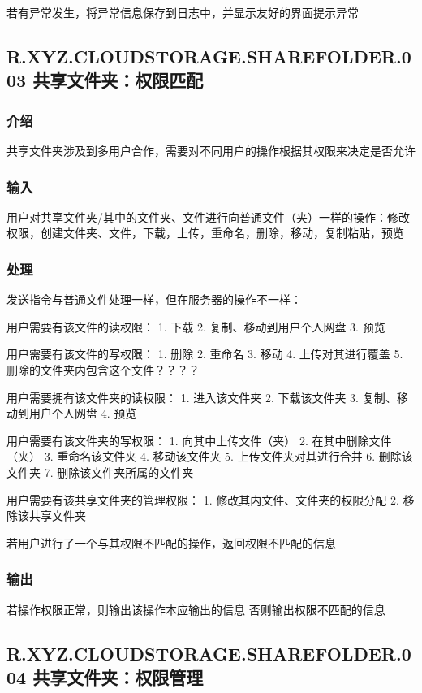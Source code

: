 若有异常发生，将异常信息保存到日志中，并显示友好的界面提示异常


\subsection{R.XYZ.CLOUDSTORAGE.SHAREFOLDER.003 共享文件夹：权限匹配}

\subsubsection{介绍}
共享文件夹涉及到多用户合作，需要对不同用户的操作根据其权限来决定是否允许

\subsubsection{输入} 
用户对共享文件夹/其中的文件夹、文件进行向普通文件（夹）一样的操作：修改权限，创建文件夹、文件，下载，上传，重命名，删除，移动，复制粘贴，预览

\subsubsection{处理} 
发送指令与普通文件处理一样，但在服务器的操作不一样：

用户需要有该文件的读权限：
1. 下载
2. 复制、移动到用户个人网盘
3. 预览

用户需要有该文件的写权限：
1. 删除
2. 重命名
3. 移动
4. 上传对其进行覆盖
5. 删除的文件夹内包含这个文件？？？？

用户需要拥有该文件夹的读权限：
1. 进入该文件夹
2. 下载该文件夹
3. 复制、移动到用户个人网盘
4. 预览

用户需要有该文件夹的写权限：
1. 向其中上传文件（夹）
2. 在其中删除文件（夹）
3. 重命名该文件夹
4. 移动该文件夹
5. 上传文件夹对其进行合并
6. 删除该文件夹
7. 删除该文件夹所属的文件夹

用户需要有该共享文件夹的管理权限：
1. 修改其内文件、文件夹的权限分配
2. 移除该共享文件夹

若用户进行了一个与其权限不匹配的操作，返回权限不匹配的信息

\subsubsection{输出} 
若操作权限正常，则输出该操作本应输出的信息
否则输出权限不匹配的信息


\subsection{R.XYZ.CLOUDSTORAGE.SHAREFOLDER.004 共享文件夹：权限管理}

